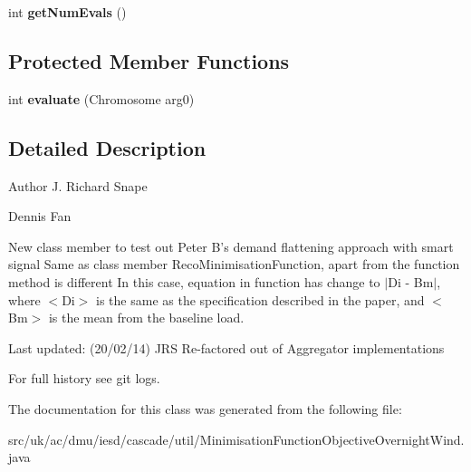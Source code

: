 \begin{DoxyCompactItemize}
\item 
\hypertarget{classuk_1_1ac_1_1dmu_1_1iesd_1_1cascade_1_1util_1_1_minimisation_function_objective_overnight_wind_af03592995dc5935342edcbcd0f37d4e4}{int {\bfseries get\-Num\-Evals} ()}\label{classuk_1_1ac_1_1dmu_1_1iesd_1_1cascade_1_1util_1_1_minimisation_function_objective_overnight_wind_af03592995dc5935342edcbcd0f37d4e4}

\end{DoxyCompactItemize}
\subsection*{Protected Member Functions}
\begin{DoxyCompactItemize}
\item 
\hypertarget{classuk_1_1ac_1_1dmu_1_1iesd_1_1cascade_1_1util_1_1_minimisation_function_objective_overnight_wind_ac1e6719100b2895ea394ecdd6349c31a}{int {\bfseries evaluate} (Chromosome arg0)}\label{classuk_1_1ac_1_1dmu_1_1iesd_1_1cascade_1_1util_1_1_minimisation_function_objective_overnight_wind_ac1e6719100b2895ea394ecdd6349c31a}

\end{DoxyCompactItemize}


\subsection{Detailed Description}
\begin{DoxyAuthor}{Author}
J. Richard Snape 

Dennis Fan
\end{DoxyAuthor}
New class member to test out Peter B's demand flattening approach with smart signal Same as class member Reco\-Minimisation\-Function, apart from the function method is different In this case, equation in function has change to $\vert$\-Di -\/ Bm$\vert$, where $<$\-Di$>$ is the same as the specification described in the paper, and $<$\-Bm$>$ is the mean from the baseline load.

Last updated\-: (20/02/14) J\-R\-S Re-\/factored out of Aggregator implementations

For full history see git logs. 

The documentation for this class was generated from the following file\-:\begin{DoxyCompactItemize}
\item 
src/uk/ac/dmu/iesd/cascade/util/Minimisation\-Function\-Objective\-Overnight\-Wind.\-java\end{DoxyCompactItemize}
